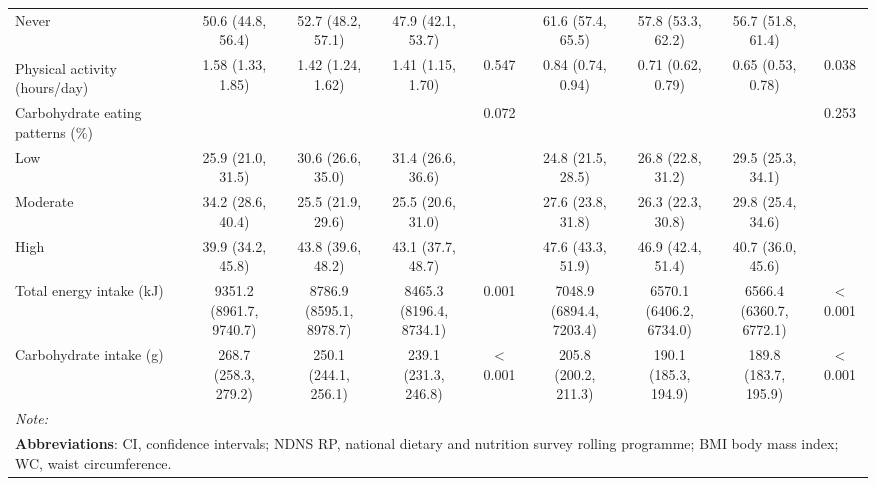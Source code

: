 \begin{table}
\begin{tabular}[t]{lcccccccc}
			\hspace{1em}Never & 50.6 (44.8, 56.4) & 52.7 (48.2, 57.1) & 47.9 (42.1, 53.7) &  & 61.6 (57.4, 65.5) & 57.8 (53.3, 62.2) & 56.7 (51.8, 61.4) & \\
			Physical activity\textsuperscript{\dag} (hours/day) & 1.58 (1.33, 1.85) & 1.42 (1.24, 1.62) & 1.41 (1.15, 1.70) & 0.547 & 0.84 (0.74, 0.94) & 0.71 (0.62, 0.79) & 0.65 (0.53, 0.78) & 0.038\\
			Carbohydrate eating patterns (\%) &  &  &  & 0.072 &  &  &  & 0.253\\
			\hspace{1em}Low & 25.9 (21.0, 31.5) & 30.6 (26.6, 35.0) & 31.4 (26.6, 36.6) &  & 24.8 (21.5, 28.5) & 26.8 (22.8, 31.2) & 29.5 (25.3, 34.1) & \\
			\hspace{1em}Moderate & 34.2 (28.6, 40.4) & 25.5 (21.9, 29.6) & 25.5 (20.6, 31.0) &  & 27.6 (23.8, 31.8) & 26.3 (22.3, 30.8) & 29.8 (25.4, 34.6) & \\
			\hspace{1em}High & 39.9 (34.2, 45.8) & 43.8 (39.6, 48.2) & 43.1 (37.7, 48.7) &  & 47.6 (43.3, 51.9) & 46.9 (42.4, 51.4) & 40.7 (36.0, 45.6) & \\
			Total energy intake (kJ) & \Centerstack{9351.2 \\ (8961.7, 9740.7)} & \Centerstack{8786.9 \\ (8595.1, 8978.7)} & \Centerstack{8465.3 \\ (8196.4, 8734.1)} & 0.001 & \Centerstack{7048.9 \\ (6894.4, 7203.4)} & \Centerstack{6570.1 \\(6406.2, 6734.0)} & \Centerstack{6566.4 \\ (6360.7, 6772.1)} & < 0.001\\
			Carbohydrate intake (g) & \Centerstack{268.7 \\ (258.3, 279.2)} & \Centerstack{250.1\\ (244.1, 256.1)} & \Centerstack{239.1 \\ (231.3, 246.8)} & < 0.001 & \Centerstack{205.8 \\(200.2, 211.3)} & \Centerstack{190.1 \\ (185.3, 194.9)} & \Centerstack{189.8 \\ (183.7, 195.9)} & < 0.001\\
			\bottomrule
			\multicolumn{9}{l}{{\scriptsize \textit{Note: }}}\\
			\multicolumn{9}{l}{{\scriptsize \textbf{Abbreviations}: CI, confidence intervals; NDNS RP, national dietary and nutrition survey rolling programme; BMI body mass index; WC, waist circumference.}}\\

\end{tabular}
\end{table}
